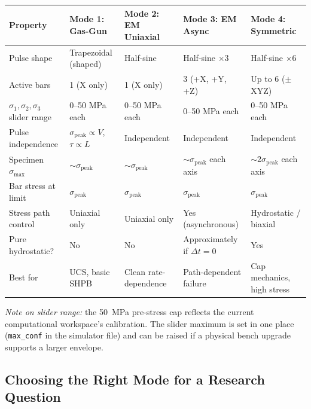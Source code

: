 \documentclass[11pt,a4paper]{article}
\providecommand{\SI}[2]{\qty{#1}{#2}}
\newcommand{\sig}{\sigma}
\newcommand{\sigpeak}{\sig_{\text{peak}}}
\begin{document}
\begin{center}
\renewcommand{\arraystretch}{1.5}
\small
\begin{tabular}{@{}p{3.6cm}p{2.6cm}p{2.6cm}p{2.6cm}p{2.6cm}@{}}
\toprule
\textbf{Property} & \textbf{Mode 1: Gas-Gun} & \textbf{Mode 2: EM Uniaxial} & \textbf{Mode 3: EM Async} & \textbf{Mode 4: Symmetric} \\
\midrule
Pulse shape & Trapezoidal (shaped) & Half-sine & Half-sine $\times 3$ & Half-sine $\times 6$ \\
Active bars & 1 (X only) & 1 (X only) & 3 (+X, +Y, +Z) & Up to 6 ($\pm$XYZ) \\
$\sig_1, \sig_2, \sig_3$ slider range & 0--50 MPa each & 0--50 MPa each & 0--50 MPa each & 0--50 MPa each \\
Pulse independence & $\sigpeak \propto V$, $\tau \propto L$ & Independent & Independent & Independent \\
Specimen $\sig_{\max}$ & $\sim \sigpeak$ & $\sim \sigpeak$ & $\sim \sigpeak$ each axis & $\sim 2\sigpeak$ each axis \\
Bar stress at limit & $\sigpeak$ & $\sigpeak$ & $\sigpeak$ & $\sigpeak$ \\
Stress path control & Uniaxial only & Uniaxial only & Yes (asynchronous) & Hydrostatic / biaxial \\
Pure hydrostatic? & No & No & Approximately if $\Delta t = 0$ & Yes \\
Best for & UCS, basic SHPB & Clean rate-dependence & Path-dependent failure & Cap mechanics, high stress \\
\bottomrule
\end{tabular}
\end{center}

\noindent\textit{Note on slider range:} the \SI{50}{MPa} pre-stress cap reflects
the current computational workspace's calibration. The slider maximum is set in one place
(\texttt{max\_conf} in the simulator file) and can be raised if a physical bench
upgrade supports a larger envelope.

\subsection{Choosing the Right Mode for a Research Question}
\end{document}
